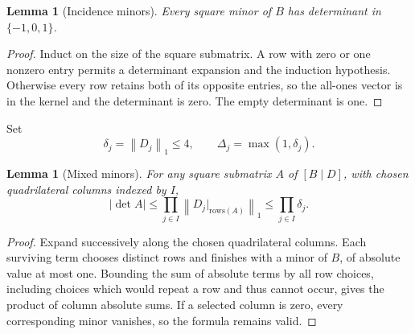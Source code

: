 \documentclass[11pt]{article}
\newtheorem{lemma}[theorem]{Lemma}
\theoremstyle{definition}
\theoremstyle{remark}
\newcommand{\norm}[1]{\left\lVert#1\right\rVert}
\begin{document}
\begin{lemma}[Incidence minors]
Every square minor of $B$ has determinant in $\{-1,0,1\}$.
\end{lemma}
\begin{proof}
Induct on the size of the square submatrix. A row with zero or one nonzero
entry permits a determinant expansion and the induction hypothesis. Otherwise
every row retains both of its opposite entries, so the all-ones vector is in
the kernel and the determinant is zero. The empty determinant is one.
\end{proof}

Set
\[
 \delta_j=\norm{D_j}_1\le4,\qquad \Delta_j=\max(1,\delta_j).
\]
\begin{lemma}[Mixed minors]
\label{lem:mixedminor}
For any square submatrix $A$ of $[B\mid D]$, with chosen quadrilateral
columns indexed by $I$,
\begin{equation}
 |\det A|\le\prod_{j\in I}\norm{D_j|_{\mathrm{rows}(A)}}_1
 \le\prod_{j\in I}\delta_j.
 \label{eq:mixedminor}
\end{equation}
\end{lemma}
\begin{proof}
Expand successively along the chosen quadrilateral columns. Each surviving
term chooses distinct rows and finishes with a minor of $B$, of absolute value
at most one. Bounding the sum of absolute terms by all row choices, including
choices which would repeat a row and thus cannot occur, gives the product
of column absolute sums. If a selected column is zero, every corresponding
minor vanishes, so the formula remains valid.
\end{proof}
\end{document}
